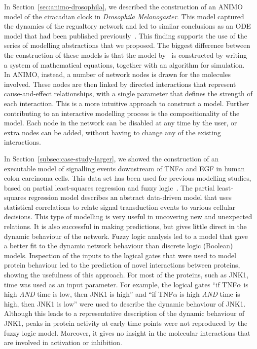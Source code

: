 \documentclass{bmcart}
\begin{document}
In Section~\ref{sec:animo-drosophila}, we described the construction of an ANIMO
model of the ciracadian clock in \emph{Drosophila Melanogaster}. This model
captured the dynamics of the regualtory network and led to similar 
conclusions as an ODE model that had been
published previously~\cite{drosophila-ode-model}. This finding supports the use of
the series of modelling abstractions that we proposed. The biggest
difference between the construction of these models is that the model by~\cite{drosophila-ode-model}
is constructed by writing a system of mathematical equations, together
with an algorithm for simulation. In ANIMO, instead, a number of network
nodes is drawn for the molecules involved. 
These nodes are then linked by directed
interactions that represent cause-and-effect relationships, with a single parameter 
that defines the strength of each
interaction. This is a more intuitive approach to construct a model.
Further contributing to an interactive modelling process
is the compositionality of the model. Each node in the network
can be disabled at any time by the user, or extra nodes can be added,
without having to change any of the existing interactions.

In Section~\ref{subsec:case-study-larger}, we showed the construction of an executable model
of signalling events downstream of
TNF$\alpha$ and EGF in human colon carcinoma cells. This data set has been used for
previous modelling studies, based on partial least-squares regression and fuzzy 
logic~\cite{pathway-leastsquare,pathway-fuzzy}.
The partial least-squares regression model describes an abstract data-driven model 
that uses statistical correlations
to relate signal transduction events to various cellular decisions. This type of modelling is
very useful in uncovering new and unexpected relations. It is also successful in making
predictions, but gives little direct in the dynamic behaviour of the network. Fuzzy
logic analysis led to a model that gave a better fit to the dynamic network behaviour than
discrete logic (Boolean) models. Inspection of the inputs to the logical gates that were used
to model protein behaviour led to the prediction of novel interactions between proteins,
showing the usefulness of this approach. For most of the proteins, such as JNK1, time was
used as an input parameter. For example, the logical gates ``if TNF$\alpha$ is high
\emph{AND} time is low, then JNK1 is high'' and ``if TNF$\alpha$ is high \emph{AND} time is
high, then JNK1 is low'' were used to
describe the dynamic behaviour of JNK1. Although this leads to a representative
description of the dynamic behaviour of JNK1, peaks in protein activity at early time points were
not reproduced by the fuzzy logic model. Moreover, it gives no insight in the molecular interactions 
that are involved in activation or inhibition.
\end{document}
